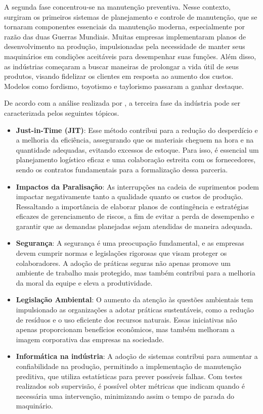 A segunda fase concentrou-se na manutenção preventiva. Nesse contexto, surgiram os primeiros sistemas de planejamento e controle de manutenção, que se tornaram componentes essenciais da manutenção moderna, especialmente por razão das duas Guerras Mundiais. Muitas empresas implementaram planos de desenvolvimento na produção, impulsionadas pela necessidade de manter seus maquinários em condições aceitáveis para desempenhar suas funções. Além disso, as indústrias começaram a buscar maneiras de prolongar a vida útil de seus produtos, visando fidelizar os clientes em resposta ao aumento dos custos. Modelos como fordismo, toyotismo e taylorismo passaram a ganhar destaque.

 De acordo com a análise realizada por \mbox{,} a terceira fase da indústria pode ser caracterizada pelos seguintes tópicos.
 \begin{itemize}
     \item \textbf{Just-in-Time (JIT)}: Esse método contribui para a redução do desperdício e a melhoria da eficiência, assegurando que os materiais cheguem na hora e na quantidade adequadas, evitando excessos de estoque. Para isso, é essencial um planejamento logístico eficaz e uma colaboração estreita com os fornecedores, sendo os contratos fundamentais para a formalização dessa parceria.

     \item \textbf{Impactos da Paralisação}: As interrupções na cadeia de suprimentos podem impactar negativamente tanto a qualidade quanto os custos de produção. Ressaltando a importância de elaborar planos de contingência e estratégias eficazes de gerenciamento de riscos, a fim de evitar a perda de desempenho e garantir que as demandas planejadas sejam atendidas de maneira adequada.

     \item \textbf{Segurança}: A segurança é uma preocupação fundamental, e as empresas devem cumprir normas e legislações rigorosas que visam proteger os colaboradores. A adoção de práticas seguras não apenas promove um ambiente de trabalho mais protegido, mas também contribui para a melhoria da moral da equipe e eleva a produtividade.

     \item \textbf{Legislação Ambiental}: O aumento da atenção às questões ambientais tem impulsionado as organizações a adotar práticas sustentáveis, como a redução de resíduos e o uso eficiente dos recursos naturais. Essas iniciativas não apenas proporcionam benefícios econômicos, mas também melhoram a imagem corporativa das empresas na sociedade.

     \item \textbf{Informática na indústria}: A adoção de sistemas contribui para aumentar a confiabilidade na produção, permitindo a implementação de manutenção preditiva, que utiliza estatísticas para prever possíveis falhas. Com testes realizados sob supervisão, é possível obter métricas que indicam quando é necessária uma intervenção, minimizando assim o tempo de parada do maquinário.  
 \end{itemize}

